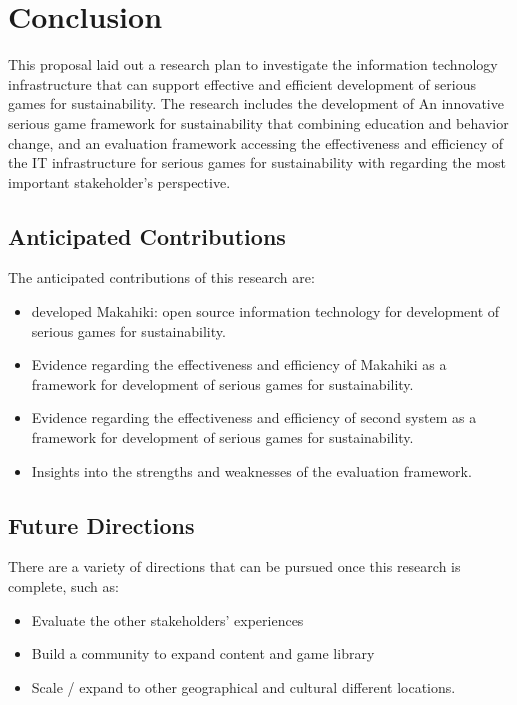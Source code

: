 \chapter{Conclusion}
\label{cha:conclusion}

This proposal laid out a research plan to investigate the information technology infrastructure that can support effective and efficient development of serious games for sustainability. The research includes the development of An innovative serious game framework for sustainability that combining education and behavior change, and an evaluation framework accessing the effectiveness and efficiency of the IT infrastructure for serious games for sustainability with regarding the most important stakeholder's perspective.

\section{Anticipated Contributions}

The anticipated contributions of this research are:

\begin{itemize}
	\item developed Makahiki: open source information technology for development of serious games for sustainability.
	\item Evidence regarding the effectiveness and efficiency of Makahiki as a framework for development of serious games for sustainability.
	\item Evidence regarding the effectiveness and efficiency of second system as a framework for development of serious games for sustainability.
	\item Insights into the strengths and weaknesses of the evaluation framework.
\end{itemize}

\section{Future Directions}

There are a variety of directions that can be pursued once this research is complete, such as:

\begin{itemize}
	\item Evaluate the other stakeholders’ experiences

    \item Build a community to expand content and game library

    \item Scale / expand to other geographical and cultural different locations.

\end{itemize}


